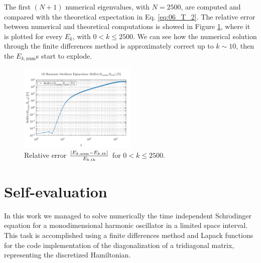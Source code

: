 \documentclass[pra, onecolumn, notitlepage, floats, 11pt]{revtex4-1}
\begin{document}
The first \( (N+1) \) numerical eigenvalues, with \( N = 2500 \), are computed and compared with the theoretical expectation in Eq. \ref{eq:06_T_2}. The relative error between numerical and theoretical computations is showed in Figure \ref{fig:06_R_5}, where it is plotted for every \( E_{k} \), with \( 0 < k \le 2500 \). We can see how the numerical solution through the finite differences method is approximately correct up to \( k \sim 10 \), then the \( E_{k,\mathrm{num}} \)s start to explode.

\begin{figure}[!h]
    \centering
    \includegraphics[width=0.5\textwidth]{images/eigenvalues.pdf}
    \caption{\label{fig:06_R_5} Relative error \( \frac{\abs{E_{k,\mathrm{num}} - E_{k,\mathrm{th}}}}{E_{k,\mathrm{th}}} \) for \( 0 < k \le 2500 \).}
\end{figure}


\section{Self-evaluation}
In this work we managed to solve numerically the time independent Schr$\mathrm{\ddot{o}}$dinger equation for a monodimensional harmonic oscillator in a limited space interval. This task is accomplished using a finite differences method and Lapack functions for the code implementation of the diagonalization of a tridiagonal matrix, representing the discretized Hamiltonian.
\end{document}
